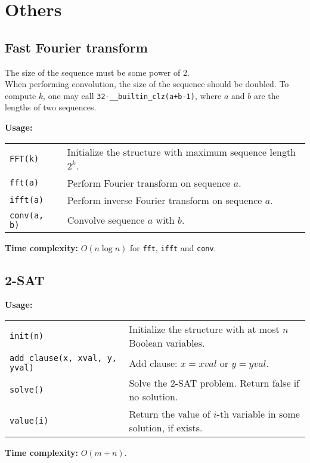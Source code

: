 \section{Others}
\subsection{Fast Fourier transform}
\Warning The size of the sequence must be some power of 2. \\
\Warning When performing convolution, the size of the sequence should be doubled. To compute $k$, one may call \lstinline|32-__builtin_clz(a+b-1)|, where $a$ and $b$ are the lengths of two sequences.  \par
\textbf{Usage:} \\[0.1cm]
\begin{tabular}{p{2cm} p{9.5cm}}
  \lstinline|FFT(k)| & Initialize the structure with maximum sequence length $2^k$. \\
  \lstinline|fft(a)| & Perform Fourier transform on sequence $a$.  \\
  \lstinline|ifft(a)| & Perform inverse Fourier transform on sequence $a$. \\
  \lstinline|conv(a, b)| & Convolve sequence $a$ with $b$. \\
\end{tabular} \par
\textbf{Time complexity:} $O(n \log n)$ for \lstinline|fft|, \lstinline|ifft| and \lstinline|conv|. \par


\subsection{2-SAT}
\textbf{Usage:} \\[0.1cm]
\begin{tabular}{p{2.5cm} p{9cm}}
  \lstinline|init(n)| & Initialize the structure with at most $n$ Boolean variables. \\
  \lstinline|add_clause(x, xval, y, yval)| & Add clause: $x = xval$ or $y = yval$.  \\
  \lstinline|solve()| & Solve the 2-SAT problem. Return false if no solution. \\
  \lstinline|value(i)| & Return the value of $i$-th variable in some solution, if exists. \\
\end{tabular} \par
\textbf{Time complexity:} $O(m+n)$. \par


